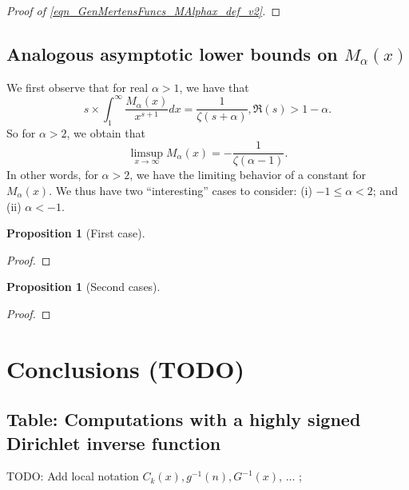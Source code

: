 \documentclass[11pt,reqno,a4letter]{article}
\numberwithin{figure}{section}
\numberwithin{table}{section}
\theoremstyle{plain}
\newtheorem{prop}[theorem]{Proposition}
\numberwithin{theorem}{section}
\theoremstyle{definition}
\begin{document}
\begin{proof}[Proof of \eqref{eqn_GenMertensFuncs_MAlphax_def_v2}]
\end{proof} 

\subsection{Analogous asymptotic lower bounds on $M_{\alpha}(x)$} 

We first observe that for real $\alpha > 1$, we have that 
\[
s \times \int_1^{\infty} \frac{M_{\alpha}(x)}{x^{s+1}} dx = \frac{1}{\zeta(s+\alpha)}, \Re(s) > 1-\alpha. 
\]
So for $\alpha > 2$, we obtain that 
\[
\limsup\limits_{x \rightarrow \infty} M_{\alpha}(x) = -\frac{1}{\zeta(\alpha-1)}. 
\]
In other words, for $\alpha > 2$, we have the limiting behavior of a constant for $M_{\alpha}(x)$. 
We thus have two ``interesting'' cases to consider: (i) $-1 \leq \alpha < 2$; 
and (ii) $\alpha < -1$. 

\begin{prop}[First case]
\end{prop} 
\begin{proof} 
\end{proof} 

\begin{prop}[Second cases]
\end{prop} 
\begin{proof} 
\end{proof} 

\newpage 
\section{Conclusions (TODO)} 

\newpage 
\renewcommand{\refname}{References and complete bibliography links} 
{}


\newpage
\renewcommand{\thesubsection}{T.\arabic{subsection}}
\subsection{Table: Computations with a highly signed Dirichlet inverse function} 
\label{table_conjecture_Mertens_ginvSeq_approx_values}

TODO: Add local notation $C_k(x), g^{-1}(n), G^{-1}(x)$, ... ; 
\end{document}
